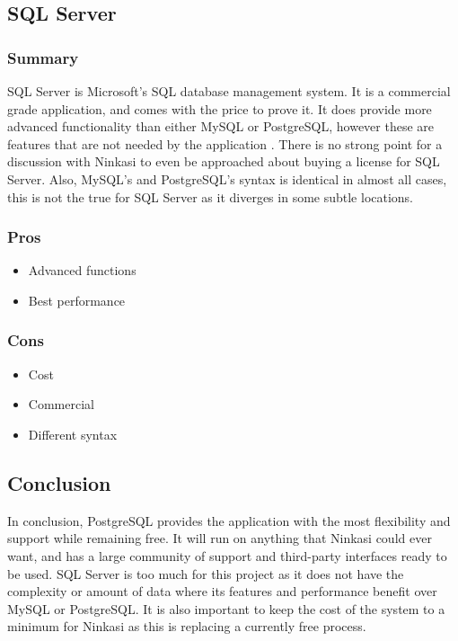 \documentclass[draftclsnofoot,onecolumn,journal,letterpaper,compsoc,10pt]{IEEEtran}
\begin{document}
    \subsection{SQL Server}
    
        \subsubsection{Summary}
        
        SQL Server is Microsoft's SQL database management system.  It is a commercial grade application, and comes with the price to prove it.  It does provide more advanced functionality than either MySQL or PostgreSQL, however these are features that are not needed by the application \cite{sql_server}.  There is no strong point for a discussion with Ninkasi to even be approached about buying a license for SQL Server.  Also, MySQL's and PostgreSQL's syntax is identical in almost all cases, this is not the true for SQL Server as it diverges in some subtle locations.
        
        \subsubsection{Pros}
        \begin{itemize}
            \item Advanced functions
            \item Best performance
        \end{itemize}
        
        \subsubsection{Cons}
        \begin{itemize}
            \item Cost
            \item Commercial
            \item Different syntax
        \end{itemize}
    
    \subsection{Conclusion}

    In conclusion, PostgreSQL provides the application with the most flexibility and support while remaining free.  It will run on anything that Ninkasi could ever want, and has a large community of support and third-party interfaces ready to be used.  SQL Server is too much for this project as it does not have the complexity or amount of data where its features and performance benefit over MySQL or PostgreSQL.  It is also important to keep the cost of the system to a minimum for Ninkasi as this is replacing a currently free process.
\end{document}
